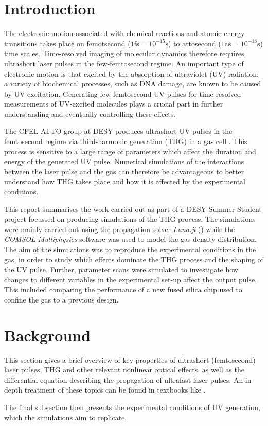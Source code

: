 \documentclass[a4paper]{jpconf}
\begin{document}
\section{Introduction}
The electronic motion associated with chemical reactions and atomic energy transitions takes place on femotsecond ($1 \text{fs} = 10^{-15} \text{s}$) to attosecond ($1 \text{as} = 10^{-18} \text{s}$) time scales. Time-resolved imaging of molecular dynamics therefore requires ultrashort laser pulses in the few-femtosecond regime. An important type of electronic motion is that excited by the absorption of ultraviolet (UV) radiation: a variety of biochemical processes, such as DNA damage, are known to be caused by UV excitation. Generating few-femtosecond UV pulses for time-resolved measurements of UV-excited molecules plays a crucial part in further understanding and eventually controlling these effects. \par 
The CFEL-ATTO group at DESY produces ultrashort UV pulses in the femtosecond regime via third-harmonic generation (THG) in a gas cell \cite{galli2019}. This process is sensitive to a large range of parameters which affect the duration and energy of the generated UV pulse. Numerical simulations of the interactions between the laser pulse and the gas can therefore be advantageous to better understand how THG takes place and how it is affected by the experimental conditions. \par 
This report summarises the work carried out as part of a DESY Summer Student project focussed on producing simulations of the THG process. The simulations were mainly carried out using the propagation solver \textit{Luna.jl} (\cite{brahms2023}) while the \textit{COMSOL Multiphysics} software was used to model the gas density distribution. The aim of the simulations was to reproduce the experimental conditions in the gas, in order to study which effects dominate the THG process and the shaping of the UV pulse. Further, parameter scans were simulated to investigate how changes to different variables in the experimental set-up affect the output pulse. This included comparing the performance of a new fused silica chip used to confine the gas to a previous design. 

\section{Background}
This section gives a brief overview of key properties of ultrashort (femtosecond) laser pulses,  THG and other relevant nonlinear optical effects, as well as the differential equation describing the propagation of ultrafast laser pulses. An in-depth treatment of these topics can be found in textbooks like \cite{keller2021, new2011}. \par 
The final subsection then presents the experimental conditions of UV generation, which the simulations aim to replicate. 
\end{document}
